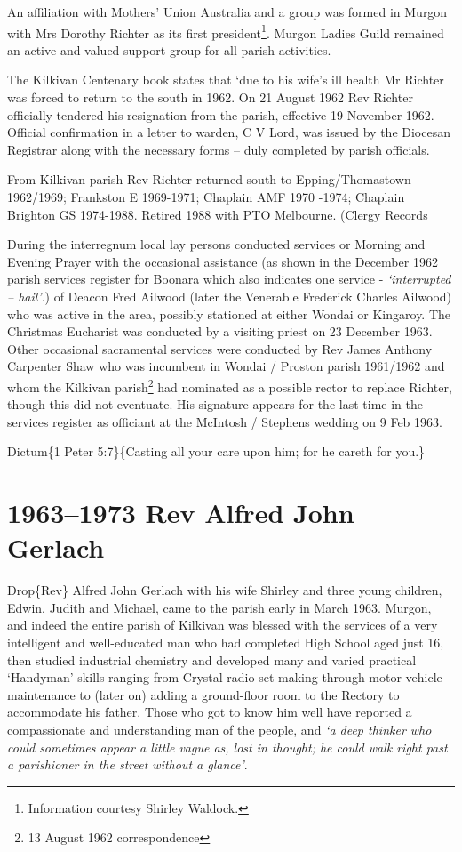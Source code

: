 An affiliation with Mothers' Union Australia and a group was formed in Murgon with Mrs Dorothy Richter as its first president\footnote{Information courtesy Shirley Waldock.}. Murgon Ladies Guild remained an active and valued support group for all parish activities.

The Kilkivan Centenary book states that `due to his wife's ill health Mr Richter was forced to return to the south in 1962. On 21 August 1962 Rev Richter officially tendered his resignation from the parish, effective 19 November 1962. Official confirmation in a letter to warden, C V Lord, was issued by the Diocesan Registrar along with the necessary forms -- duly completed by parish officials.

From Kilkivan parish Rev Richter returned south to Epping/Thomastown 1962/1969; Frankston E 1969-1971; Chaplain AMF 1970 -1974; Chaplain Brighton GS 1974-1988. Retired 1988 with PTO Melbourne. (Clergy Records

During the interregnum local lay persons conducted services or Morning and Evening Prayer with the occasional assistance (as shown in the December 1962 parish services register for Boonara which also indicates one service - \emph{`interrupted -- hail'}.) of Deacon Fred Ailwood (later the Venerable Frederick Charles Ailwood) who was active in the area, possibly stationed at either Wondai or Kingaroy. The Christmas Eucharist was conducted by a visiting priest on 23 December 1963. Other occasional sacramental services were conducted by Rev James Anthony Carpenter Shaw who was incumbent in Wondai / Proston parish 1961/1962 and whom the Kilkivan parish\footnote{13 August 1962 correspondence} had nominated as a possible rector to replace Richter, though this did not eventuate. His signature appears for the last time in the services register as officiant at the McIntosh / Stephens wedding on 9 Feb 1963.

Dictum\{1 Peter 5:7\}\{Casting all your care upon him; for he careth for you.\}

\hypertarget{rev-alfred-john-gerlach}{%
\chapter{1963--1973 Rev Alfred John Gerlach}\label{rev-alfred-john-gerlach}}

Drop\{Rev\} Alfred John Gerlach with his wife Shirley and three young children, Edwin, Judith and Michael, came to the parish early in March 1963. Murgon, and indeed the entire parish of Kilkivan was blessed with the services of a very intelligent and well-educated man who had completed High School aged just 16, then studied industrial chemistry and developed many and varied practical `Handyman' skills ranging from Crystal radio set making through motor vehicle maintenance to (later on) adding a ground-floor room to the Rectory to accommodate his father. Those who got to know him well have reported a compassionate and understanding man of the people, and \emph{`a deep thinker who could sometimes appear a little vague as, lost in thought; he could walk right past a parishioner in the street without a glance'}.

